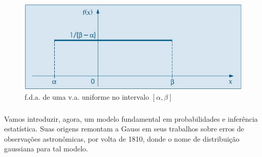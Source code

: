 \documentclass[14pt,aspectratio=1610]{beamer}
\begin{document}
\begin{frame}{}
\frametitle{}
\begin{block}{}
\justifying
\begin{figure}[H]
    \centering
    \includegraphics[scale=0.5]{Figuras/uniform}
    \caption{f.d.a. de uma v.a. uniforme no intervalo $[\alpha,\beta]$}
  \end{figure}
\end{block}
\end{frame}

\begin{frame}{}
\frametitle{}
\begin{block}{}
\justifying
Vamos introduzir, agora, um modelo fundamental em probabilidades e inferência estatística. Suas origens remontam a Gauss em seus trabalhos sobre erros de observações astronômicas, por volta de 1810, donde o nome de distribuição gaussiana para tal modelo.
\end{block}
\end{frame}
\end{document}
